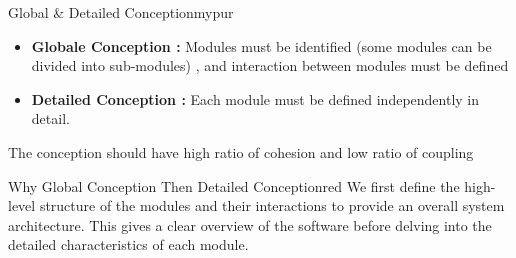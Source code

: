 \begin{prettyBox}{Global \& Detailed Conception}{mypur}
    \begin{itemize}
        \item \textbf{Globale Conception :} Modules must be identified (some modules can 
be divided into sub-modules) , and interaction between modules must be defined
        \item \textbf{Detailed Conception :} Each module must be defined independently in detail.
    \end{itemize}
The conception should have high ratio of cohesion and low ratio of coupling
\end{prettyBox}

\vspace{0.5cm}

\begin{prettyBox}{Why Global Conception Then Detailed Conception}{red} 
    We first define the high-level structure of the modules and their interactions to provide an overall system architecture.
    This gives a clear overview of the software before delving into the detailed characteristics of each module.
\end{prettyBox}

\vspace{0.5cm}


